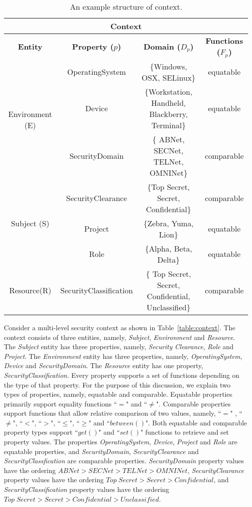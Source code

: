 \begin{table*}[t]
\caption{An example structure of context.}
\label{table:context}
\begin{center}
\begin{tabular}{|c|c|c|c|}
\hline
\multicolumn{4}{|c|}{ \bf Context}\\
\hline
{ \bf Entity} & {\bf Property ($p$)} & { \bf Domain ($D_p$)} & {\bf Functions ($F_p$)}\\
\hline
\multirow{3}{*}{Environment (E)} & OperatingSystem & \{Windows, OSX, SELinux\}&  equatable\\
                                                    & Device & \{Workstation, Handheld, Blackberry, Terminal\} & equatable \\
                                                    & SecurityDomain & \{ ABNet, SECNet, TELNet, OMNINet\} & comparable\\ 
\hline
\multirow{3}{*}{Subject (S)} & SecurityClearance & \{Top Secret, Secret, Confidential\} &  comparable\\
				      &Project & \{Zebra, Yuma, Lion\} & equatable\\
				       &Role & \{Alpha, Beta, Delta\} & equatable\\

\hline
 Resource(R) & SecurityClassification & \{ Top Secret, Secret, Confidential, Unclassified\} & comparable \\
\hline

\end{tabular}
\end{center}
\label{default}
\end{table*} 

Consider a multi-level security context as shown in Table~\ref{table:context}. The context consists of three entities, namely, {\em Subject}, {\em Environment} and {\em Resource}. The {\em Subject} entity has three properties, namely, {\em Security Clearance}, {\em Role} and {\em Project}.  The {\em Environment} entity has three properties, namely, {\em OperatingSystem}, {\em Device} and {\em SecurityDomain}.  The {\em Resource} entity has one property, {\em SecurityClassification}. Every property supports a set of functions depending on the type of that property.  For the purpose of this discussion, we explain two types of properties, namely, equatable and comparable.  Equatable properties primarily support equality functions  ``$=$" and ``$\ne$". Comparable properties support functions that allow relative comparison of two values, namely, ``$=$" , ``$\ne$", ``$<$", ``$>$",  ``$\leq$", ``$\geq$" and ``$between()$". Both equatable and comparable property types support ``$get()$" and ``$set()$" functions to retrieve and set property values. The properties {\em OperatingSystem}, {\em Device}, {\em Project} and {\em Role} are equatable properties, and {\em SecurityDomain}, {\em SecurityClearance} and {\em SecurityClassfication} are comparable properties. {\em SecurityDomain} property values have the ordering $ABNet > SECNet > TELNet > OMNINet$,  {\em SecurityClearance} property values have the ordering $Top\;Secret > Secret > Confidential$, and {\em SecurityClassification} property values have the ordering $Top\;Secret > Secret > Confidential > Unclassified$. 

